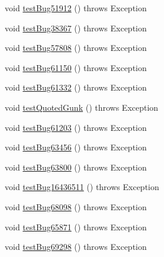 \begin{DoxyCompactItemize}
\item 
void \mbox{\hyperlink{classtestsuite_1_1regression_1_1_meta_data_regression_test_a38cf409b423124090866e96e64226104}{test\+Bug51912}} ()  throws Exception 
\item 
void \mbox{\hyperlink{classtestsuite_1_1regression_1_1_meta_data_regression_test_a8ef9287c41ad42ae8faf6e7bb34a6fcb}{test\+Bug38367}} ()  throws Exception 
\item 
void \mbox{\hyperlink{classtestsuite_1_1regression_1_1_meta_data_regression_test_ade987f06121aa11b35ee8860ae893a51}{test\+Bug57808}} ()  throws Exception 
\item 
void \mbox{\hyperlink{classtestsuite_1_1regression_1_1_meta_data_regression_test_ab171769c1d241e02730a4b626b9bd150}{test\+Bug61150}} ()  throws Exception 
\item 
void \mbox{\hyperlink{classtestsuite_1_1regression_1_1_meta_data_regression_test_aaf434af6a2a4b3cc948e8973837c8cca}{test\+Bug61332}} ()  throws Exception 
\item 
void \mbox{\hyperlink{classtestsuite_1_1regression_1_1_meta_data_regression_test_aad58713a1f82200b0cbfa647caf0a130}{test\+Quoted\+Gunk}} ()  throws Exception 
\item 
void \mbox{\hyperlink{classtestsuite_1_1regression_1_1_meta_data_regression_test_a0dd9e6de4ad836964f235a4a27aed144}{test\+Bug61203}} ()  throws Exception 
\item 
void \mbox{\hyperlink{classtestsuite_1_1regression_1_1_meta_data_regression_test_a8d8e4af7ca8136d86aa2ea60237ceb89}{test\+Bug63456}} ()  throws Exception 
\item 
void \mbox{\hyperlink{classtestsuite_1_1regression_1_1_meta_data_regression_test_af38b67a5bf6e3396cd891b3f8b4d2c8f}{test\+Bug63800}} ()  throws Exception 
\item 
void \mbox{\hyperlink{classtestsuite_1_1regression_1_1_meta_data_regression_test_a1fd3d694ae818586b9e77cceb5bfbbb3}{test\+Bug16436511}} ()  throws Exception 
\item 
void \mbox{\hyperlink{classtestsuite_1_1regression_1_1_meta_data_regression_test_a70f7534e3db316950ae32e2142e9ade2}{test\+Bug68098}} ()  throws Exception 
\item 
void \mbox{\hyperlink{classtestsuite_1_1regression_1_1_meta_data_regression_test_a8cde8eefe9689a7113484b6de4827afd}{test\+Bug65871}} ()  throws Exception 
\item 
void \mbox{\hyperlink{classtestsuite_1_1regression_1_1_meta_data_regression_test_a1367bf2ebe3a308c3d374e28648699fc}{test\+Bug69298}} ()  throws Exception 

\end{DoxyCompactItemize}
